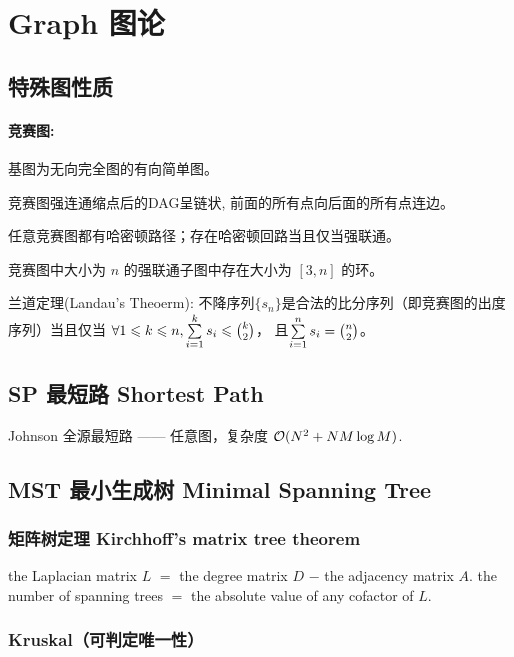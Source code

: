 
\section{Graph 图论}

\subsection{特殊图性质}

\paragraph{竞赛图:} 基图为无向完全图的有向简单图。

\begin{compactenum}
	\item 竞赛图强连通缩点后的DAG呈链状, 前面的所有点向后面的所有点连边。
	\item 任意竞赛图都有哈密顿路径；存在哈密顿回路当且仅当强联通。
  \item 竞赛图中大小为 $n$ 的强联通子图中存在大小为 $[3, n]$ 的环。
  \item 兰道定理(Landau's Theoerm): 
  不降序列$\{s_n\}$是合法的比分序列（即竞赛图的出度序列）当且仅当
  \(\forall 1 \leqslant k \leqslant n, \sum\limits_{i = 1}^{k}s_i \leqslant \tbinom{k}{2}\)，
  且$\sum\limits_{i = 1}^n s_i = \tbinom{n}{2}$。
\end{compactenum}

\subsection{SP 最短路 Shortest Path}

Johnson 全源最短路 —— 任意图，复杂度 $\mathcal{O}(N^2 + N M \log M)$.


\subsection{MST 最小生成树 Minimal Spanning Tree}

\subsubsection{矩阵树定理 Kirchhoff's matrix tree theorem}

\noindent the Laplacian matrix $L$ $=$ the degree matrix $D$ $-$ the adjacency matrix $A$. the number of spanning trees $=$ the absolute value of any cofactor of $L$.

\subsubsection{Kruskal（可判定唯一性）}

